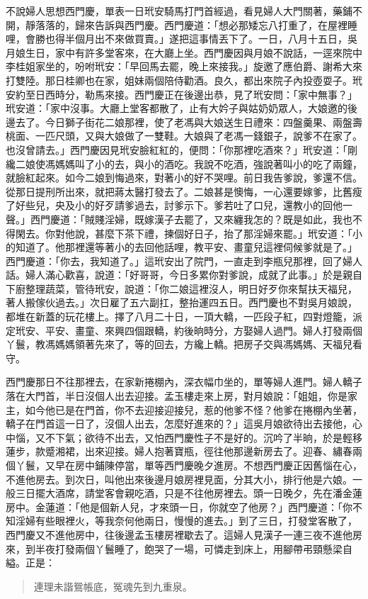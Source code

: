 不說婦人思想西門慶，單表一日玳安騎馬打門首經過，看見婦人大門關著，藥鋪不開，靜落落的，歸來告訴與西門慶。西門慶道：「想必那矮忘八打重了，在屋裡睡哩，會勝也得半個月出不來做買賣。」遂把這事情丟下了。一日，八月十五日，吳月娘生日，家中有許多堂客來，在大廳上坐。西門慶因與月娘不說話，一逕來院中李桂姐家坐的，吩咐玳安：「早回馬去罷，晚上來接我。」旋邀了應伯爵、謝希大來打雙陸。那日桂卿也在家，姐妹兩個陪侍勸酒。良久，都出來院子內投壺耍子。玳安約至日西時分，勒馬來接。西門慶正在後邊出恭，見了玳安問：「家中無事？」玳安道：「家中沒事。大廳上堂客都散了，止有大妗子與姑奶奶眾人，大娘邀的後邊去了。今日獅子街花二娘那裡，使了老馮與大娘送生日禮來：四盤羹果、兩盤壽桃面、一匹尺頭，又與大娘做了一雙鞋。大娘與了老馮一錢銀子，說爹不在家了。也沒曾請去。」西門慶因見玳安臉紅紅的，便問：「你那裡吃酒來？」玳安道：「剛纔二娘使馮媽媽叫了小的去，與小的酒吃。我說不吃酒，強說著叫小的吃了兩鐘，就臉紅起來。如今二娘到悔過來，對著小的好不哭哩。前日我告爹說，爹還不信。從那日提刑所出來，就把蔣太醫打發去了。二娘甚是懊悔，一心還要嫁爹，比舊瘦了好些兒，央及小的好歹請爹過去，討爹示下。爹若吐了口兒，還教小的回他一聲。」西門慶道：「賊賤淫婦，既嫁漢子去罷了，又來纏我怎的？既是如此，我也不得閑去。你對他說，甚麼下茶下禮，揀個好日子，抬了那淫婦來罷。」玳安道：「小的知道了。他那裡還等著小的去回他話哩，教平安、畫童兒這裡伺候爹就是了。」西門慶道：「你去，我知道了。」這玳安出了院門，一直走到李瓶兒那裡，回了婦人話。婦人滿心歡喜，說道：「好哥哥，今日多累你對爹說，成就了此事。」於是親自下廚整理蔬菜，管待玳安，說道：「你二娘這裡沒人，明日好歹你來幫扶天福兒，著人搬傢伙過去。」次日雇了五六副扛，整抬運四五日。西門慶也不對吳月娘說，都堆在新蓋的玩花樓上。擇了八月二十日，一頂大轎，一匹段子紅，四對燈籠，派定玳安、平安、畫童、來興四個跟轎，約後晌時分，方娶婦人過門。婦人打發兩個丫鬟，教馮媽媽領著先來了，等的回去，方纔上轎。把房子交與馮媽媽、天福兒看守。

西門慶那日不往那裡去，在家新捲棚內，深衣幅巾坐的，單等婦人進門。婦人轎子落在大門首，半日沒個人出去迎接。孟玉樓走來上房，對月娘說：「姐姐，你是家主，如今他已是在門首，你不去迎接迎接兒，惹的他爹不怪？他爹在捲棚內坐著，轎子在門首這一日了，沒個人出去，怎麼好進來的？」這吳月娘欲待出去接他，心中惱，又不下氣；欲待不出去，又怕西門慶性子不是好的。沉吟了半晌，於是輕移蓮步，款蹙湘裙，出來迎接。婦人抱著寶瓶，徑往他那邊新房去了。迎春、繡春兩個丫鬟，又早在房中鋪陳停當，單等西門慶晚夕進房。不想西門慶正因舊惱在心，不進他房去。到次日，叫他出來後邊月娘房裡見面，分其大小，排行他是六娘。一般三日擺大酒席，請堂客會親吃酒，只是不往他房裡去。頭一日晚夕，先在潘金蓮房中。金蓮道：「他是個新人兒，才來頭一日，你就空了他房？」西門慶道：「你不知淫婦有些眼裡火，等我奈何他兩日，慢慢的進去。」到了三日，打發堂客散了，西門慶又不進他房中，往後邊孟玉樓房裡歇去了。這婦人見漢子一連三夜不進他房來，到半夜打發兩個丫鬟睡了，飽哭了一場，可憐走到床上，用腳帶弔頸懸梁自縊。正是：
\begin{quote}
連理未諧鴛帳底，冤魂先到九重泉。
\end{quote}

